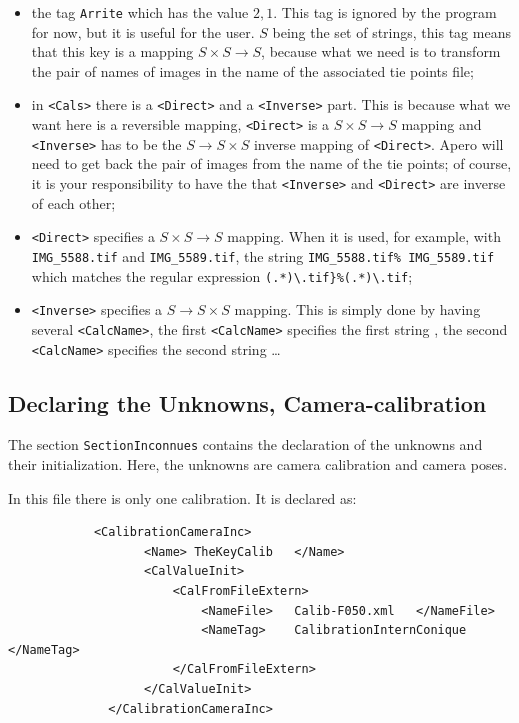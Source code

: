 \begin{itemize}
   \item  the tag {\tt Arrite} which has the value $2 , 1$. This tag is ignored by the program
          for now, but it is useful for the user.
          $S$ being the set of strings, this tag means  that this key is a mapping $S\times S\rightarrow S$,
          because what we need is to transform the pair of names of images in the name of
          the associated tie points file;

   \item  in {\tt <Cals>}  there is a {\tt <Direct>} and a {\tt <Inverse>}
          part. This is because what we want here is a reversible mapping, {\tt <Direct>}
          is a $S\times S\rightarrow S$ mapping and {\tt <Inverse>} has to be the $S\rightarrow S\times S$
          inverse mapping of  {\tt <Direct>}. Apero will need to get back
          the pair of images from the name of the tie points; of course, it is your responsibility
          to have the  that {\tt <Inverse>}  and  {\tt <Direct>} are inverse
          of each other;

    \item {\tt <Direct>} specifies a $S\times S\rightarrow S$ mapping. When it is used, for example, with
          {\tt IMG\_5588.tif}  and {\tt IMG\_5589.tif}, the string {\tt IMG\_5588.tif\% IMG\_5589.tif}
          which matches the regular expression {\tt  (.*)\textbackslash.tif\}\%(.*)\textbackslash.tif};

    \item  {\tt <Inverse>} specifies a $S\rightarrow S\times S$ mapping. This is simply
           done by having several {\tt  <CalcName>}, the first {\tt  <CalcName>} specifies
           the first string , the second {\tt  <CalcName>} specifies
           the second string \dots

\end{itemize}

\subsection{Declaring the Unknowns, Camera-calibration}

The section {\tt SectionInconnues} contains the declaration of the
unknowns and their initialization. Here, the unknowns are camera
calibration and camera poses.

In this file there is only one calibration. It is declared as:

{\scriptsize
\begin{verbatim}
            <CalibrationCameraInc>
                   <Name> TheKeyCalib   </Name>
                   <CalValueInit>
                       <CalFromFileExtern>
                           <NameFile>   Calib-F050.xml   </NameFile>
                           <NameTag>    CalibrationInternConique </NameTag>
                       </CalFromFileExtern>
                   </CalValueInit>
              </CalibrationCameraInc>
\end{verbatim}
}

